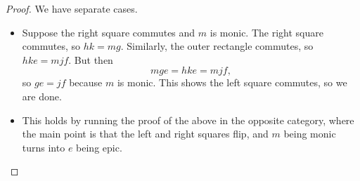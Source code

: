 \documentclass[../notes.tex]{subfiles}
\begin{document}
\begin{proof}
	We have separate cases.
	\begin{itemize}
		\item Suppose the right square commutes and $m$ is monic. The right square commutes, so $hk=mg$. Similarly, the outer rectangle commutes, so $hke=mjf$. But then
		\[mge=hke=mjf,\]
		so $ge=jf$ because $m$ is monic. This shows the left square commutes, so we are done.
		\item This holds by running the proof of the above in the opposite category, where the main point is that the left and right squares flip, and $m$ being monic turns into $e$ being epic.
		\qedhere
	\end{itemize}
\end{proof}
\end{document}
